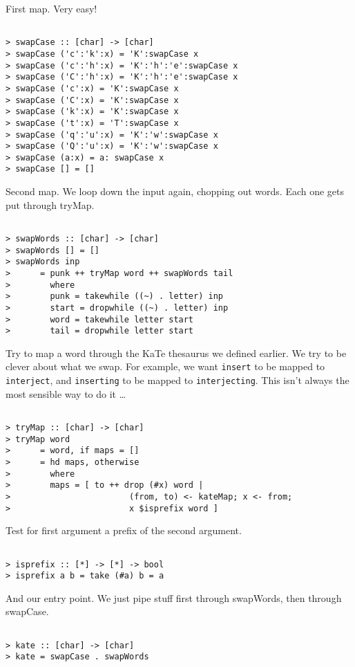 \documentclass[10pt]{article}
\begin{document}
First map. Very easy!

\begin{verbatim}

> swapCase :: [char] -> [char]
> swapCase ('c':'k':x) = 'K':swapCase x
> swapCase ('c':'h':x) = 'K':'h':'e':swapCase x
> swapCase ('C':'h':x) = 'K':'h':'e':swapCase x
> swapCase ('c':x) = 'K':swapCase x
> swapCase ('C':x) = 'K':swapCase x
> swapCase ('k':x) = 'K':swapCase x
> swapCase ('t':x) = 'T':swapCase x
> swapCase ('q':'u':x) = 'K':'w':swapCase x
> swapCase ('Q':'u':x) = 'K':'w':swapCase x
> swapCase (a:x) = a: swapCase x
> swapCase [] = []

\end{verbatim}

Second map. We loop down the input again, chopping out words. Each one gets
put through tryMap.

\begin{verbatim}

> swapWords :: [char] -> [char]
> swapWords [] = []
> swapWords inp
>      = punk ++ tryMap word ++ swapWords tail
>        where
>        punk = takewhile ((~) . letter) inp
>        start = dropwhile ((~) . letter) inp
>        word = takewhile letter start
>        tail = dropwhile letter start

\end{verbatim}

Try to map a word through the KaTe thesaurus we defined earlier. We try to be
clever about what we swap. For example, we want \verb"insert" to be mapped to
\verb"interject", and \verb"inserting" to be mapped to \verb"interjecting".
This isn't always the most sensible way to do it \ldots

\begin{verbatim}

> tryMap :: [char] -> [char]
> tryMap word
>      = word, if maps = []
>      = hd maps, otherwise
>        where
>        maps = [ to ++ drop (#x) word | 
>                        (from, to) <- kateMap; x <- from; 
>                        x $isprefix word ]

\end{verbatim}

Test for first argument a prefix of the second argument.

\begin{verbatim}

> isprefix :: [*] -> [*] -> bool
> isprefix a b = take (#a) b = a

\end{verbatim}

And our entry point. We just pipe stuff first through swapWords, then through
swapCase.

\begin{verbatim}

> kate :: [char] -> [char]
> kate = swapCase . swapWords

\end{verbatim}
\end{document}
